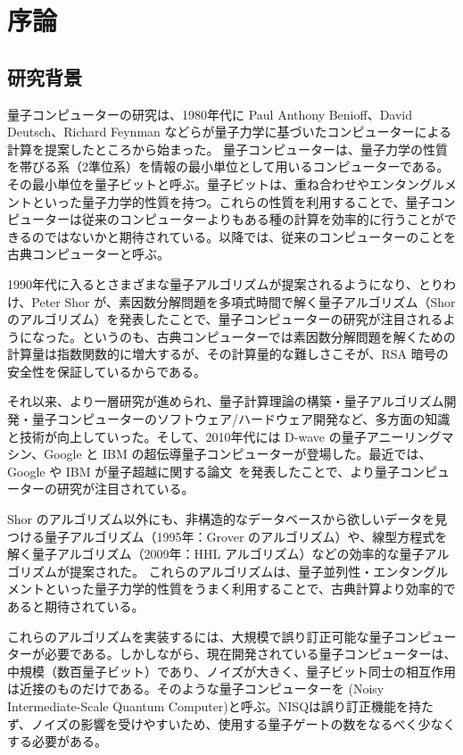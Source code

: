\chapter{序論}


\section{研究背景}
量子コンピューターの研究は、1980年代に Paul Anthony Benioff、David Deutsch、Richard Feynman などらが量子力学に基づいたコンピューターによる計算を提案したところから始まった\cite{benioff1980computer,deutsch1985quantum,feynman1982simulating}。
量子コンピューターは、量子力学の性質を帯びる系（2準位系）を情報の最小単位として用いるコンピューターである。その最小単位を量子ビットと呼ぶ。量子ビットは、重ね合わせやエンタングルメントといった量子力学的性質を持つ。これらの性質を利用することで、量子コンピューターは従来のコンピューターよりもある種の計算を効率的に行うことができるのではないかと期待されている。以降では、従来のコンピューターのことを古典コンピューターと呼ぶ。

1990年代に入るとさまざまな量子アルゴリズムが提案されるようになり、とりわけ、Peter Shor が、素因数分解問題を多項式時間で解く量子アルゴリズム\cite{shor1997polynomial-time}（Shor のアルゴリズム）を発表したことで、量子コンピューターの研究が注目されるようになった。というのも、古典コンピューターでは素因数分解問題を解くための計算量は指数関数的に増大するが、その計算量的な難しさこそが、RSA 暗号の安全性を保証しているからである。

それ以来、より一層研究が進められ、量子計算理論の構築・量子アルゴリズム開発・量子コンピューターのソフトウェア/ハードウェア開発など、多方面の知識と技術が向上していった。そして、2010年代には D-wave の量子アニーリングマシン、Google と IBM の超伝導量子コンピューターが登場した。最近では、Google や IBM が量子超越に関する論文~\cite{arute2019quantum,kim2023evidence}を発表したことで、より量子コンピューターの研究が注目されている。

Shor のアルゴリズム以外にも、非構造的なデータベースから欲しいデータを見つける量子アルゴリズム\cite{grover1996fast}（1995年：Grover のアルゴリズム）や、線型方程式を解く量子アルゴリズム\cite{harrow2009quantum}（2009年：HHL アルゴリズム）などの効率的な量子アルゴリズムが提案された。
これらのアルゴリズムは、量子並列性・エンタングルメントといった量子力学的性質をうまく利用することで、古典計算より効率的であると期待されている。

これらのアルゴリズムを実装するには、大規模で誤り訂正可能な量子コンピューターが必要である。しかしながら、現在開発されている量子コンピューターは、中規模（数百量子ビット）であり、ノイズが大きく、量子ビット同士の相互作用は近接のものだけである。そのような量子コンピューターを  (Noisy Intermediate-Scale Quantum Computer)と呼ぶ\cite{preskill2018quantum}。NISQは誤り訂正機能を持たず、ノイズの影響を受けやすいため、使用する量子ゲートの数をなるべく少なくする必要がある。

